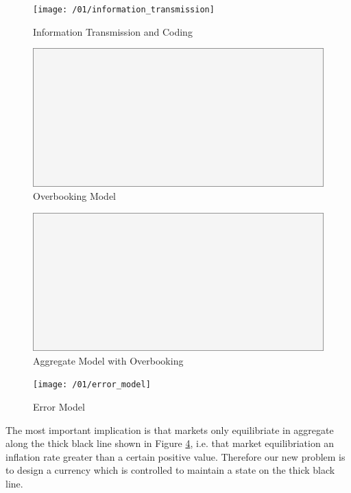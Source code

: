 \begin{figure}[H]
\centering
\texttt{[image: /01/information\_transmission]}
\caption{Information Transmission and Coding}
\label{fig:information_transmission}
\end{figure}

\begin{figure}[H]
\centering
\includegraphics[scale=0.48]{blank}
\caption{Overbooking Model}
\label{fig:overbooking}
\end{figure}

\begin{figure}[H]
\centering
\includegraphics[scale=0.48]{blank}
\caption{Aggregate Model with Overbooking}
\label{fig:aggregate_overbooking}
\end{figure}

\begin{figure}[H]
\centering
\texttt{[image: /01/error\_model]}
\caption{Error Model}
\label{fig:error_model}
\end{figure}

The most important implication is that markets only equilibriate in aggregate along the thick black
line shown in Figure \ref{fig:error_model}, i.e. that market equilibriation an inflation rate
greater than a certain positive value. Therefore our new problem is to design a currency which is
controlled to maintain a state on the thick black line.

